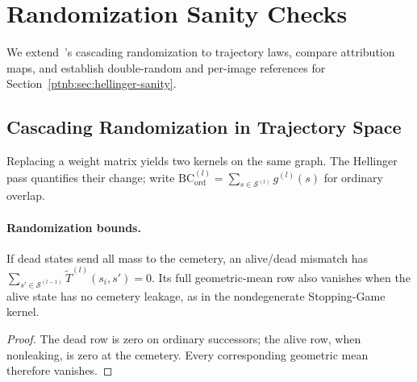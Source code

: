 \begin{table}[htbp]
\TableContent{
    \centering\small
    \setlength{\tabcolsep}{4pt}
    
    }%
\caption[Reference baselines for the input-noise sweep]{Reference baselines for the input-noise sweep, averaged over $R$ pairs drawn from the
    $565$-image ImageNet-S test split (clean rows: $R=200$ sampled pairs; clean-vs-random: $R=565$
    images paired with a fresh Gaussian each; random-vs-random: $R=200$ Gaussian pairs); entries are
    mean $\pm$ standard deviation over pairs. \textbf{clean-intraclass}: $\mathrm{H}(\Pi_A(x_1),
        \Pi_A(x_2))$ with $x_1, x_2$ from the same ground-truth class; \textbf{clean-interclass}: same,
    with distinct classes; \textbf{clean-vs-random}: one side clean, other Gaussian;
    \textbf{random-vs-random}: both sides Gaussian.}
    \label{ptnb:tab:hellinger-input-random}
\end{table}
\par\medskip
\section{Randomization Sanity Checks}\label{ptnb:app:sanity-check}\label{subsec:hellinger_randomization}

We extend~\textcite{Adebayo2018sanity}'s cascading randomization to trajectory laws, compare attribution maps, and establish double-random and per-image references for Section~\ref{ptnb:sec:hellinger-sanity}.

\subsection{Cascading Randomization in Trajectory Space}\label{ptnb:sec:lmp-randomization}

Replacing a weight matrix yields two kernels on the same graph. The Hellinger pass quantifies their change; write $\mathrm{BC}^{(l)}_{\mathrm{ord}}=\sum_{s\in\mathcal S^{(l)}}g^{(l)}(s)$ for ordinary overlap.

\paragraph{Randomization bounds.}
\begin{lemmaenv}\label{ptnb:lem:alive-mismatch}
If dead states send all mass to the cemetery, an alive/dead mismatch has
$\sum_{s'\in\mathcal S^{(l-1)}}\widetilde T^{(l)}(s_i,s')=0$.
Its full geometric-mean row also vanishes when the alive state has no cemetery leakage,
as in the nondegenerate Stopping-Game kernel.
\end{lemmaenv}
\begin{proof}
The dead row is zero on ordinary successors; the alive row, when nonleaking, is zero at the cemetery. Every corresponding geometric mean therefore vanishes.
\end{proof}

